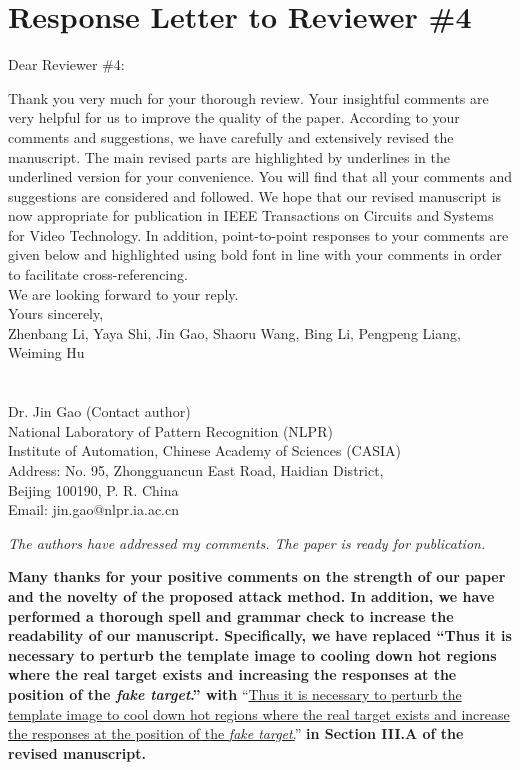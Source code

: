 \documentclass[12pt]{article}
\begin{document}
\clearpage
\newpage
{\centering\section*{Response Letter to Reviewer \#4}}
\noindent Dear Reviewer \#4:

Thank you very much for your thorough review. Your insightful comments are very helpful for us to improve the quality of the paper. According to your comments and suggestions, we have carefully and extensively revised the manuscript. The main revised parts are highlighted by underlines in the underlined version for your convenience. You will find that all your comments and suggestions are considered and followed. We hope that our revised manuscript is now appropriate for publication in IEEE Transactions on Circuits and Systems for Video Technology.
In addition, point-to-point responses to your comments are given below and highlighted using bold font in line with your comments in order to facilitate cross-referencing.\\[10pt]
\indent We are looking forward to your reply.\\[10pt]
\noindent Yours sincerely,\\
\noindent Zhenbang Li, Yaya Shi, Jin Gao, Shaoru Wang, Bing Li, Pengpeng Liang, Weiming Hu
\\
\\
\\
\noindent Dr. Jin Gao (Contact author)\\
\noindent National Laboratory of Pattern Recognition (NLPR)\\
\noindent Institute of Automation, Chinese Academy of Sciences (CASIA)\\
\noindent Address: No. 95, Zhongguancun East Road, Haidian District,\\
\noindent Beijing 100190, P. R. China\\
\noindent Email: jin.gao@nlpr.ia.ac.cn

\newpage
\textit{The authors have addressed my comments. The paper is ready for publication.}

\textbf{Many thanks for your positive comments on the strength of our paper and the novelty of the proposed attack method. In addition, we have performed a thorough spell and grammar check to increase the readability of our manuscript. Specifically, we have replaced ``Thus it is necessary to perturb the template image to cooling down hot regions where the real target exists and increasing the responses at the position of the \textit{fake target}.'' with} ``\uline{Thus it is necessary to perturb the template image to cool down hot regions where the real target exists and increase the responses at the position of the \textit{fake target}.}''
\textbf{in Section III.A of the revised manuscript.}
\end{document}
